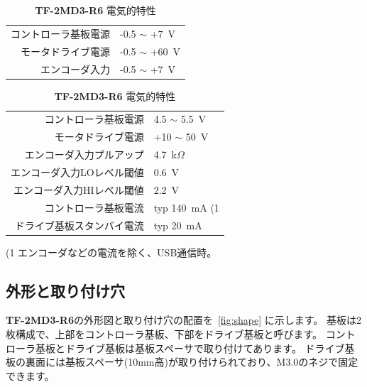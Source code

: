 \documentclass[11pt,a4j,openany,fleqn]{jbook}
\begin{document}
\begin{table}[H]
\begin{minipage}[t]{0.44\hsize}
\caption{{\bf TF-2MD3-R6} 絶対最大定格}
\label{tb:abs_max6}
\centering\begin{tabular}{rl}
\toprule
コントローラ基板電源 & -0.5 $\sim$ +7~V \\
モータドライブ電源 & -0.5 $\sim$ +60~V \\
\midrule
エンコーダ入力 & -0.5 $\sim$ +7~V \\
\bottomrule
\end{tabular}
\end{minipage}
\begin{minipage}[t]{0.54\hsize}
\caption{{\bf TF-2MD3-R6} 電気的特性}
\label{tb:el_char6}
{\centering\begin{tabular}{rl}
\toprule
コントローラ基板電源 & 4.5 $\sim$ 5.5~V \\
モータドライブ電源 & +10 $\sim$ 50~V \\
\midrule
エンコーダ入力プルアップ & 4.7~k$\Omega$ \\
エンコーダ入力LOレベル閾値 & 0.6~V \\
エンコーダ入力HIレベル閾値 & 2.2~V \\
\midrule
コントローラ基板電流 & typ 140~mA {\footnotesize(1} \\
ドライブ基板スタンバイ電流 & typ 20~mA \\
\bottomrule
\end{tabular}
}
{\newline\smallskip\footnotesize{(1} エンコーダなどの電流を除く、USB通信時。}
\end{minipage}
\end{table}


\subsection{外形と取り付け穴}
\label{sec:外形と取り付け穴}

{\bf TF-2MD3-R6}の外形図と取り付け穴の配置を\figurename~\ref{fig:shape} に示します。
基板は2枚構成で、上部をコントローラ基板、下部をドライブ基板と呼びます。
コントローラ基板とドライブ基板は基板スペーサで取り付けてあります。
ドライブ基板の裏面には基板スペーサ(10mm高)が取り付けられており、M3.0のネジで固定できます。
\end{document}
